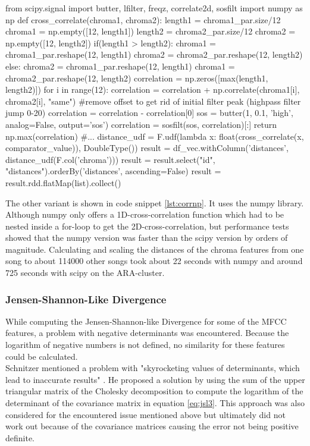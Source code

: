 \begin{pythonCode}[frame=single,label={lst:corrnp},caption={cross-correlation numpy},captionpos=b]
from scipy.signal import butter, lfilter, freqz, correlate2d, sosfilt
import numpy as np
def cross_correlate(chroma1, chroma2):
    length1 = chroma1_par.size/12
    chroma1 = np.empty([12, length1])
    length2 = chroma2_par.size/12
    chroma2 = np.empty([12, length2])
    if(length1 > length2):
        chroma1 = chroma1_par.reshape(12, length1)
        chroma2 = chroma2_par.reshape(12, length2)
    else:
        chroma2 = chroma1_par.reshape(12, length1)
        chroma1 = chroma2_par.reshape(12, length2)      
    correlation = np.zeros([max(length1, length2)])
    for i in range(12):
        correlation = correlation + np.correlate(chroma1[i], chroma2[i], "same")    
    #remove offset to get rid of initial filter peak (highpass filter jump 0-20)
    correlation = correlation - correlation[0]
    sos = butter(1, 0.1, 'high', analog=False, output='sos')
    correlation = sosfilt(sos, correlation)[:]
    return np.max(correlation)
#...
distance_udf = F.udf(lambda x: float(cross_correlate(x, comparator_value)), DoubleType())
result = df_vec.withColumn('distances', distance_udf(F.col('chroma')))
result = result.select("id", "distances").orderBy('distances', ascending=False)
result = result.rdd.flatMap(list).collect()
\end{pythonCode}

\noindent The other variant is shown in code snippet \ref{lst:corrnp}. It uses the numpy library. Although numpy only offers a 1D-cross-correlation function which had to be nested inside a for-loop to get the 2D-cross-correlation, but performance tests showed that the numpy version was faster than the scipy version by orders of magnitude. Calculating and scaling the distances of the chroma features from one song to about 114000 other songs took about 22 seconds with numpy and around 725 seconds with scipy on the ARA-cluster. 

\subsubsection{Jensen-Shannon-Like Divergence}\label{jsld}

While computing the Jensen-Shannon-like Divergence for some of the MFCC features, a problem with negative determinants was encountered. Because the logarithm of negative numbers is not defined, no similarity for these features could be calculated.\\ 
Schnitzer mentioned a problem with "skyrocketing values of determinants, which lead to inaccurate results" \cite[p.45]{schnitzer1}. He proposed a solution by using the sum of the upper triangular matrix of the Cholesky decomposition to compute the logarithm of the determinant of the covariance matrix in equation \ref{eq:jsl3}. 
This approach was also considered for the encountered issue mentioned above but ultimately did not work out because of the covariance matrices causing the error not being positive definite.\\

